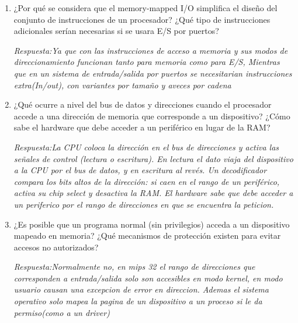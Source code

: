 \documentclass[11pt, a4paper]{article}
\begin{document}
\begin{enumerate}[leftmargin=*, label=\arabic*.]
    \vspace{0.2cm}
    \textit{Respuesta:Si 2 dispositivos responden a la misma direccion intentaria manejar el bus de datos a la vez, las lecturas devolverian datos corructos y las escrituras llegarian a ambos. Se evita con un mapa de memoria sin solapamiento,decodificadores de selecciones y en sistemas modernos con firnware o sistemas operativos que asignan rangos de operacion a cada dispositivo}
    \vspace{1.5cm}

    \item ¿Por qué se considera que el memory-mapped I/O simplifica el diseño del conjunto de instrucciones de un procesador? ¿Qué tipo de instrucciones adicionales serían necesarias si se usara E/S por puertos?
    
    \vspace{0.2cm}
    \textit{Respuesta:Ya que con las instrucciones de acceso a memoria y sus modos de direccionamiento funcionan tanto para memoria como para E/S, Mientras que en un sistema de entrada/salida por puertos se necesitarian instrucciones extra(In/out), con variantes por tamaño y aveces por cadena}
    \vspace{1.5cm}

    \item ¿Qué ocurre a nivel del bus de datos y direcciones cuando el procesador accede a una dirección de memoria que corresponde a un dispositivo? ¿Cómo sabe el hardware que debe acceder a un periférico en lugar de la RAM?
    
    \vspace{0.2cm}
    \textit{Respuesta:La CPU coloca la dirección en el bus de direcciones y activa las señales de control (lectura o escritura). En lectura el dato viaja del dispositivo a la CPU por el bus de datos, y en escritura al revés. Un decodificador compara los bits altos de la dirección: si caen en el rango de un periférico, activa su chip select y desactiva la RAM. El hardware sabe que debe acceder a un periferico por el rango de direcciones en que se encuentra la peticion.}
    \vspace{1.5cm}

    \item ¿Es posible que un programa normal (sin privilegios) acceda a un dispositivo mapeado en memoria? ¿Qué mecanismos de protección existen para evitar accesos no autorizados?
    
    \vspace{0.2cm}
    \textit{Respuesta:Normalmente no, en mips 32 el rango de direcciones que corresponden a entrada/salida solo son accesibles en modo kernel, en modo usuario causan una excepcion de error en direccion. Ademas el sistema operativo solo mapea la pagina de un dispositivo a un proceso si le da permiso(como a un driver)}
    \vspace{1.5cm}


\end{enumerate}
\end{document}
